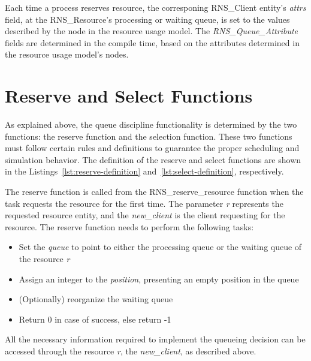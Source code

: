 

Each time a process reserves resource, the corresponing RNS\_Client entity's \emph{attrs} field, at the RNS\_Resource's processing or waiting queue, is set to the values described by the node in the resource usage model. The \emph{RNS\_Queue\_Attribute} fields are determined in the compile time, based on the attributes determined in the resource usage model's nodes.

\section{Reserve and Select Functions}

As explained above, the queue discipline functionality is determined by the two functions: the reserve function and the selection function. These two functions must follow certain rules and definitions to guarantee the proper scheduling and simulation behavior. The definition of the reserve and select functions are shown in the Listings~\ref{lst:reserve-definition} and~\ref{lst:select-definition}, respectively.



The reserve function is called from the RNS\_reserve\_resource function when the task requests  the resource for the first time. The parameter \emph{r} represents the requested resource entity, and the \emph{new\_client} is the client requesting for the resource. The reserve function needs to perform the following tasks:

\begin{itemize}
\item Set the \emph{queue} to point to either the processing queue or the waiting queue of the resource \emph{r}
\item Assign an integer to the \emph{position}, presenting an empty position in the queue
\item (Optionally) reorganize the waiting queue
\item Return 0 in case of success, else return -1
\end{itemize}

All the necessary information required to implement the queueing decision can be accessed through the resource \emph{r}, the \emph{new\_client}, as described above.

